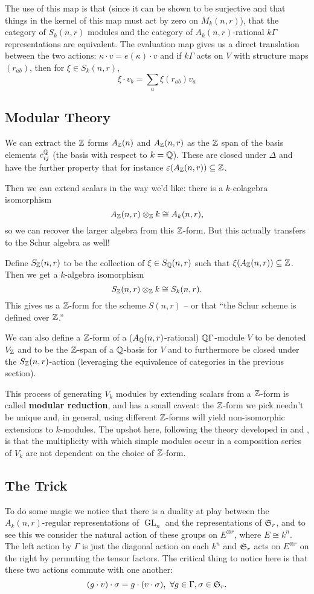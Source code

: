 \documentclass[12pt]{article}
\DeclareMathOperator{\1}{\mathbbm{1}}
\DeclareMathOperator{\GL}{GL}
\begin{document}
The use of this map is that (since it can be shown to be surjective and that things in the kernel of this map must act by zero on $M_k(n,r)$), that the category
of $S_k(n,r)$ modules and the category of $A_k(n,r)$-rational $k\Gamma$ representations are equivalent. The evaluation map gives us a direct translation between 
the two actions: $\kappa\cdot v=e(\kappa)\cdot v$ and if $k\Gamma$ acts on $V$ with structure maps $(r_{ab})$, then for $\xi\in S_k(n,r)$,
\[\xi\cdot v_b=\sum_a \xi(r_{ab})v_a\]

\subsection{Modular Theory}
We can extract the $\mathbb{Z}$ forms $A_{\mathbb{Z}}(n)$ and $A_{\mathbb{Z}}(n,r)$ as the $\mathbb{Z}$ span of the basis elements $c_{ij}^{\mathbb{Q}}$ (the basis with respect to $k=\mathbb{Q}$). These 
are closed under $\Delta$ and have the further property that for instance $\varepsilon(A_{\mathbb{Z}}(n,r))\subseteq\mathbb{Z}$.

Then we can extend scalars in the way we'd like: there is a $k$-colagebra isomorphism 
\[A_{\mathbb{Z}}(n,r)\otimes_{\mathbb{Z}} k\cong A_k(n,r),\] 
so we can recover the larger algebra from this $\mathbb{Z}$-form. But this actually transfers to the Schur algebra as well!

Define $S_{\mathbb{Z}}(n,r)$ to be the collection of $\xi\in S_{\mathbb{Q}}(n,r)$ such that $\xi(A_{\mathbb{Z}}(n,r))\subseteq\mathbb{Z}$. Then we get a $k$-algebra isomorphism
\[S_{\mathbb{Z}}(n,r)\otimes_{\mathbb{Z}} k\cong S_k(n,r).\]
This gives us a $\mathbb{Z}$-form for the scheme $S(n,r)$ -- or that ``the Schur scheme is defined over $\mathbb{Z}$.''

We can also define a $\mathbb{Z}$-form of a ($A_{\mathbb{Q}}(n,r)$-rational) $\mathbb{Q}\Gamma$-module $V$ to be denoted $V_{\mathbb{Z}}$ and to be the $\mathbb{Z}$-span of a $\mathbb{Q}$-basis for $V$
and to furthermore be closed under the $S_{\mathbb{Z}}(n,r)$-action (leveraging the equivalence of categories in the previous section).

This process of generating $V_k$ modules by extending scalars from a $\mathbb{Z}$-form is called \textbf{modular reduction}, and has a small caveat:
the $\mathbb{Z}$-form we pick needn't be unique and, in general, using different $\mathbb{Z}$-forms will yield non-isomorphic extensions to $k$-modules. The upshot here,
following the theory developed in \cite{brauer} and \cite{green-locFinReps}, is that the multiplicity with which simple modules occur in a composition series of $V_k$
are not dependent on the choice of $\mathbb{Z}$-form.

\subsection{The Trick}
To do some magic we notice that there is a duality at play between the $A_k(n,r)$-regular representations of $\GL_n$ and the representations of $\mathfrak{S}_r$, 
and to see this we consider the natural action of these groups on $E^{\otimes r}$, where $E\cong k^n$. The left action by $\Gamma$ is just the diagonal action 
on each $k^n$ and $\mathfrak{S}_r$ acts on $E^{\otimes r}$ on the right by permuting the tensor factors. The critical thing to notice here is that these two 
actions commute with one another:
\[(g\cdot v)\cdot\sigma=g\cdot(v\cdot\sigma),\ \forall g\in\Gamma, \sigma\in\frakS_r.\]
\end{document}
